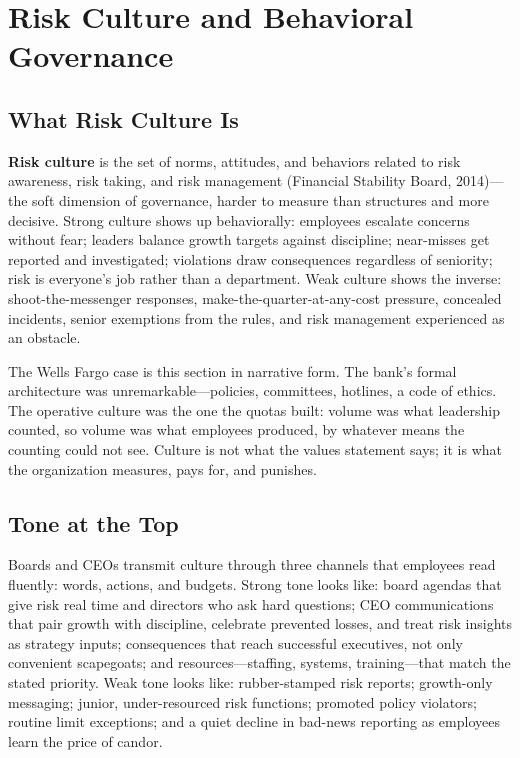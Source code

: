 \documentclass[11pt,openany]{book}
\begin{document}
\section{Risk Culture and Behavioral Governance}
\label{sec:culture}

\subsection{What Risk Culture Is}

\textbf{Risk culture} is the set of norms, attitudes, and behaviors related
to risk awareness, risk taking, and risk management (Financial Stability
Board, 2014)---the soft dimension of governance, harder to measure than
structures and more decisive. Strong culture shows up behaviorally: employees
escalate concerns without fear; leaders balance growth targets against
discipline; near-misses get reported and investigated; violations draw
consequences regardless of seniority; risk is everyone's job rather than a
department. Weak culture shows the inverse: shoot-the-messenger responses,
make-the-quarter-at-any-cost pressure, concealed incidents, senior exemptions
from the rules, and risk management experienced as an obstacle.

The Wells Fargo case is this section in narrative form. The bank's formal
architecture was unremarkable---policies, committees, hotlines, a code of
ethics. The operative culture was the one the quotas built: volume was what
leadership counted, so volume was what employees produced, by whatever means
the counting could not see. Culture is not what the values statement says; it
is what the organization measures, pays for, and punishes.

\subsection{Tone at the Top}
\label{subsec:tone}

Boards and CEOs transmit culture through three channels that employees read
fluently: words, actions, and budgets. Strong tone looks like: board agendas
that give risk real time and directors who ask hard questions; CEO
communications that pair growth with discipline, celebrate prevented losses,
and treat risk insights as strategy inputs; consequences that reach
successful executives, not only convenient scapegoats; and
resources---staffing, systems, training---that match the stated priority.
Weak tone looks like: rubber-stamped risk reports; growth-only messaging;
junior, under-resourced risk functions; promoted policy violators; routine
limit exceptions; and a quiet decline in bad-news reporting as employees
learn the price of candor.
\end{document}
